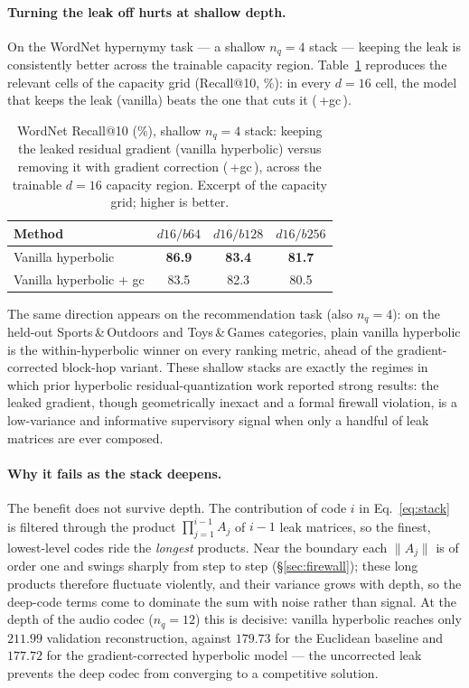 \documentclass[12pt]{report}
\begin{document}
\paragraph{Turning the leak off hurts at shallow depth.}
On the WordNet hypernymy task --- a shallow $n_q=4$ stack --- keeping the leak is consistently better across the trainable capacity region. Table~\ref{tab:gc_leak} reproduces the relevant cells of the capacity grid (Recall@10, \%): in every $d{=}16$ cell, the model that keeps the leak (vanilla) beats the one that cuts it (\,+gc\,).
\begin{table}[h]
\centering
\caption{WordNet Recall@10 (\%), shallow $n_q=4$ stack: keeping the leaked residual gradient (vanilla hyperbolic) versus removing it with gradient correction (\,+gc\,), across the trainable $d{=}16$ capacity region. Excerpt of the capacity grid; higher is better.}
\label{tab:gc_leak}
\begin{tabular}{lccc}
\hline
Method & $d16/b64$ & $d16/b128$ & $d16/b256$ \\
\hline
Vanilla hyperbolic       & \textbf{86.9} & \textbf{83.4} & \textbf{81.7} \\
Vanilla hyperbolic + gc  & 83.5 & 82.3 & 80.5 \\
\hline
\end{tabular}
\end{table}
The same direction appears on the recommendation task (also $n_q=4$): on the held-out Sports\,\&\,Outdoors and Toys\,\&\,Games categories, plain vanilla hyperbolic is the within-hyperbolic winner on every ranking metric, ahead of the gradient-corrected block-hop variant. These shallow stacks are exactly the regimes in which prior hyperbolic residual-quantization work reported strong results: the leaked gradient, though geometrically inexact and a formal firewall violation, is a low-variance and informative supervisory signal when only a handful of leak matrices are ever composed.

\paragraph{Why it fails as the stack deepens.}
The benefit does not survive depth. The contribution of code $i$ in Eq.~\ref{eq:stack} is filtered through the product $\prod_{j=1}^{i-1}A_j$ of $i-1$ leak matrices, so the finest, lowest-level codes ride the \emph{longest} products. Near the boundary each $\|A_j\|$ is of order one and swings sharply from step to step (\S\ref{sec:firewall}); these long products therefore fluctuate violently, and their variance grows with depth, so the deep-code terms come to dominate the sum with noise rather than signal. At the depth of the audio codec ($n_q=12$) this is decisive: vanilla hyperbolic reaches only $211.99$ validation reconstruction, against $179.73$ for the Euclidean baseline and $177.72$ for the gradient-corrected hyperbolic model --- the uncorrected leak prevents the deep codec from converging to a competitive solution.
\end{document}
